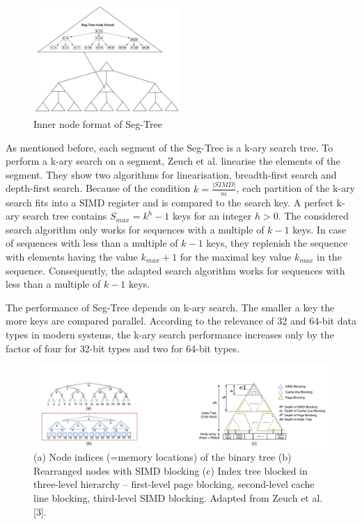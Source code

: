 \documentclass[conference]{IEEEtran}
\begin{document}
\begin{figure}
	\includegraphics[width=0.5\textwidth]{figure_2.png}
	\caption{Inner node format of Seg-Tree}
	\label{fig}
\end{figure}

As mentioned before, each segment of the Seg-Tree is a k-ary search tree. To perform a k-ary search on a segment, Zeuch et al. linearise the elements of the segment. They show two algorithms for linearisation, breadth-first search and depth-first search. Because of the condition $k = \frac{\vert SIMD \vert }{m}$, each partition of the k-ary search fits into a SIMD register and is compared to the search key. A perfect k-ary search tree contains  $S_{max} = k^h - 1$ keys for an integer $h > 0$. The considered search algorithm only works for sequences with a multiple of $k-1$ keys. In case of  sequences with less than a multiple of $k-1$ keys, they replenish the sequence with elements having the value $k_{max} + 1$ for the maximal key value $k_{max}$ in the sequence. Consequently, the adapted search algorithm works for sequences with less than a multiple of $k-1$ keys.

The performance of Seg-Tree depends on k-ary search. The smaller a key the more keys are compared parallel. According to the relevance of 32 and 64-bit data types in modern systems, the k-ary search performance increases only by the factor of four for 32-bit types and two for 64-bit types.

\begin{figure}
	\includegraphics[width=1.0\textwidth]{figure_3.png}
	\caption{(a) Node indices (=memory locations) of the binary tree (b) Rearranged nodes with SIMD blocking (c) Index tree blocked in three-level
		hierarchy – first-level page blocking, second-level cache line blocking, third-level SIMD blocking. Adapted from Zeuch et al. [3].}
	\label{fig}
\end{figure}
\end{document}
